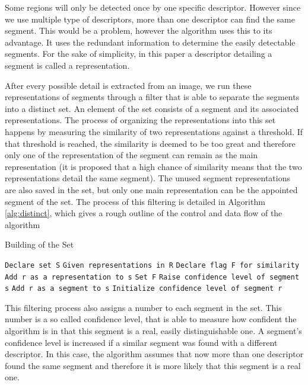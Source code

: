 Some regions will only be detected once by one specific descriptor. However since we use multiple type of descriptors, more than one descriptor can find the same segment. This would be a problem, however the algorithm uses this to its advantage. It uses the redundant information to determine the easily detectable segments. For the sake of simplicity, in this paper a descriptor detailing a segment is called a representation.

After every possible detail is extracted from an image, we run these representations of segments through a filter that is able to separate the segments into a distinct set. An element of the set consists of a segment and its associated representations. The process of organizing the representations into this set happens by measuring the similarity of two representations against a threshold. If that threshold is reached, the similarity is deemed to be too great and therefore only one of the representation of the segment can remain as the main representation (it is proposed that a high chance of similarity means that the two representations detail the same segment). The unused segment representations are also saved in the set, but only one main representation can be the appointed segment of the set. The process of this filtering is detailed in Algorithm \ref{alg:distinct}, which gives a rough outline of the control and data flow of the algorithm
\begin{algorithm}
\caption{Building of the Set}\label{alg:distinct}
\begin{algorithmic}
    \State \texttt{Declare set S}
    \State \texttt{Given representations in R}
        \State \texttt{Declare flag F for similarity}
                \State \texttt{Add r as a representation to s}
                \State \texttt{Set F}
                \State \texttt{Raise confidence level of segment s}
            \EndIf
        \EndFor
            \State \texttt{Add r as a segment to s}
            \State \texttt{Initialize confidence level of segment r}
        \EndIf
    \EndFor
\end{algorithmic}
\end{algorithm}


This filtering process also assigns a number to each segment in the set. This number is a so called confidence level, that is able to measure how confident the algorithm is in that this segment is a real, easily distinguishable one. A segment's confidence level is increased if a similar segment was found with a different descriptor. In this case, the algorithm assumes that now more than one descriptor found the same segment and therefore it is more likely that this segment is a real one. 

